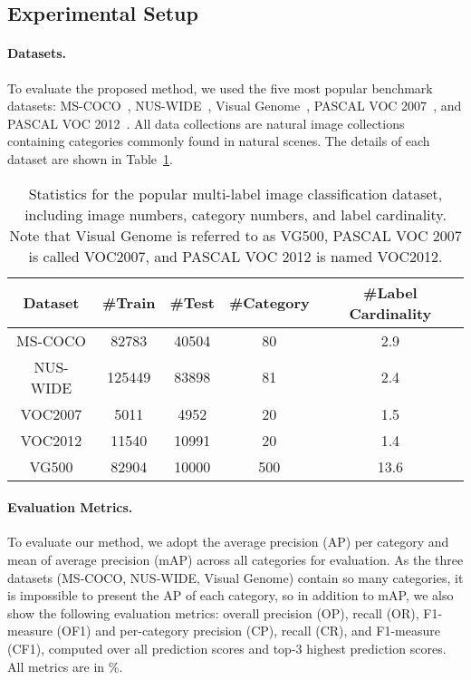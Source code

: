 \documentclass{ecai}
\begin{document}
\subsection{Experimental Setup}
\paragraph{Datasets.}
To evaluate the proposed method, we used the five most popular benchmark datasets: MS-COCO~\cite{lin2014microsoft}, NUS-WIDE~\cite{chua2009nus}, Visual Genome~\cite{krishna2017visual}, PASCAL VOC 2007~\cite{everingham2015pascal}, and PASCAL VOC 2012~\cite{everingham2015pascal}. 
All data collections are natural image collections containing categories commonly found in natural scenes.
The details of each dataset are shown in Table~\ref{tab:dataset}.
\begin{table}
	\centering
\begin{tabular}{c|cccc}
		\hline
		Dataset        & \#Train  & \#Test  & \#Category  & \#Label Cardinality  \\
		\hline
		MS-COCO         & 82783    & 40504  & 80  & 2.9 \\
		NUS-WIDE        & 125449   & 83898  & 81  & 2.4  \\
		VOC2007         & 5011     & 4952   & 20  & 1.5 \\
		VOC2012         & 11540    & 10991  & 20  & 1.4 \\
		VG500           & 82904    & 10000  & 500 & 13.6  \\
		\hline
	\end{tabular}
	\caption{Statistics for the popular multi-label image classification dataset, including image numbers, category numbers, and label cardinality. Note that Visual Genome is referred to as VG500, PASCAL VOC 2007 is called VOC2007, and PASCAL VOC 2012 is named VOC2012.}
	\label{tab:dataset}
	\vspace{-0.5cm}
\end{table} 

\paragraph{Evaluation Metrics.}
To evaluate our method, we adopt the average precision (AP) per category and mean of average precision (mAP) across all categories for evaluation.
As the three datasets (MS-COCO, NUS-WIDE, Visual Genome) contain so many categories, it is impossible to present the AP of each category, so in addition to mAP, we also show the following evaluation metrics: overall precision (OP), recall (OR), F1-measure (OF1) and per-category precision (CP), recall (CR), and F1-measure (CF1), computed over all prediction scores and top-3 highest prediction scores. All metrics are in \%. 
\end{document}
